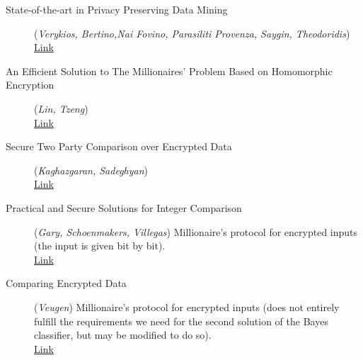 \documentclass[11pt]{article}
\begin{document}
\begin{description}
	\item [State-of-the-art in Privacy Preserving Data Mining](\emph{Verykios, Bertino,Nai Fovino, Parasiliti Provenza, Saygin, Theodoridis})
	\\ \href{http://www.sigmod.org/publications/sigmod-record/0403/B1.bertion-sigmod-record2.pdf}{Link}
	
	\item [An Efficient Solution to The Millionaires' Problem Based on Homomorphic Encryption](\emph{Lin, Tzeng})
	\\ \href{http://eprint.iacr.org/2005/043.pdf}{Link}
	                
	\item [Secure Two Party Comparison over Encrypted Data](\emph{Kaghazgaran, Sadeghyan})
	\\ \href{http://ieeexplore.ieee.org/stamp/stamp.jsp?tp=&arnumber=6141405&tag=1}{Link} 
	
	\item [Practical and Secure Solutions for Integer Comparison](\emph{Gary, Schoenmakers, Villegas})
	Millionaire's protocol for encrypted inputs (the input is given bit by bit).
	\\ \href{http://www.win.tue.nl/~berry/papers/pkc07intcomp.pdf}{Link}   
	
	                                                                                             
	\item [Comparing Encrypted Data](\emph{Veugen}) \cite{Veugen}
 	Millionaire's protocol for encrypted inputs (does not entirely fulfill the requirements we need for the second solution of the Bayes classifier, but may be modified to do so).   
	\\ \href{http://msp.ewi.tudelft.nl/sites/default/files/Comparing%20encrypted%20data.pdf}{Link}
\end{description}





\newpage





\end{document}
